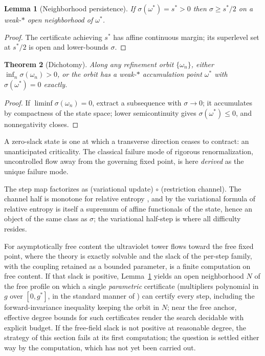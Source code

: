 \documentclass[11pt]{article}
\newtheorem{theorem}{Theorem}[section]
\newtheorem{lemma}[theorem]{Lemma}
\theoremstyle{definition}
\theoremstyle{remark}
\begin{document}
\begin{lemma}[Neighborhood persistence]\label{lem:persistence}
If $\sigma(\omega^*) = s^* > 0$ then $\sigma \ge s^*/2$ on a weak-$*$
open neighborhood of $\omega^*$.
\end{lemma}
\begin{proof}
The certificate achieving $s^*$ has affine continuous margin; its
superlevel set at $s^*/2$ is open and lower-bounds $\sigma$.
\end{proof}

\begin{theorem}[Dichotomy]\label{thm:dichotomy}
Along any refinement orbit $\{\omega_n\}$, either $\inf_n
\sigma(\omega_n) > 0$, or the orbit has a weak-$*$ accumulation point
$\omega^*$ with $\sigma(\omega^*) = 0$ exactly.
\end{theorem}
\begin{proof}
If $\liminf \sigma(\omega_n) = 0$, extract a subsequence with $\sigma \to
0$; it accumulates by compactness of the state space; lower
semicontinuity gives $\sigma(\omega^*) \le 0$, and nonnegativity closes.
\end{proof}

\noindent A zero-slack state is one at which a transverse direction
ceases to contract: an unanticipated criticality.  The classical failure
mode of rigorous renormalization, uncontrolled flow away from the
governing fixed point, is here \emph{derived} as the unique failure
mode.

The step map factorizes as (variational update) $\circ$ (restriction
channel).  The channel half is monotone for relative entropy
\cite{uhlmann}, and by the variational formula of \cite{kosaki} relative
entropy is itself a supremum of affine functionals of the state, hence an
object of the same class as $\sigma$; the variational half-step is where
all difficulty resides.

For asymptotically free content the ultraviolet tower flows toward the
free fixed point, where the theory is exactly solvable and the slack of
the per-step family, with the coupling retained as a bounded parameter,
is a finite computation on free content.  If that slack is positive,
Lemma~\ref{lem:persistence} yields an open neighborhood $N$ of the free
profile on which a single \emph{parametric} certificate (multipliers
polynomial in $g$ over $[0, g^*]$, in the standard manner of
\cite{putinar,lasserre}) can certify every step, including the
forward-invariance inequality keeping the orbit in $N$; near the free
anchor, effective degree bounds for such certificates \cite{niesch}
render the search decidable with explicit budget.  If the free-field
slack is not positive at reasonable degree, the strategy of this section
fails at its first computation; the question is settled either way by
the computation, which has not yet been carried out.
\end{document}
